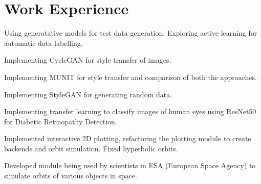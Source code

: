 \documentclass[a4paper]{deedy-resume-openfont}
\begin{document}
\begin{minipage}[t]{0.66\textwidth} 




\section{Work Experience}
\vspace{\topsep} %
\begin{tightemize}
\item Using generatative models for test data generation. Exploring active learning for automatic data labelling.
\item Implementing CycleGAN for style transfer of images. 
\item Implementing MUNIT for style transfer and comparison of both the approaches.
\item Implementing StyleGAN for generating random data.
\end{tightemize}

\vspace{\topsep} %
\begin{tightemize}
\item Implementing transfer learning to classify images of human eyes using ResNet50 for Diabetic Retinopathy Detection.
\end{tightemize}


\begin{tightemize}
\item Implemented interactive 2D plotting, refactoring the plotting module to create backends and orbit simulation. Fixed hyperbolic orbits.
\item Developed module being used by scientists in ESA (European Space Agency) to simulate orbits of various objects in space.


\end{tightemize}
\end{minipage}
\end{document}

